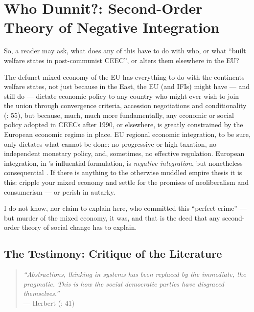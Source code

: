 \documentclass[11pt,a4paper,oneside,openright]{article}
\begin{document}
\newpage

\section{Who Dunnit?: Second-Order Theory of Negative Integration} \label{sec:who_dunnit}

So, a reader may ask, what does any of this have to do with who, or what  ``built welfare states in post-communist \gls{CEEC}'', or alters them elsewhere in the \gls{EU}? 

The defunct mixed economy of the \gls{EU} has everything to do with the continents welfare states, not just because in the East, the \gls{EU} (and \glspl{IFI}) might have --- and still do --- dictate economic policy to any country who might ever wish to join the union through convergence criteria, accession negotiations and conditionality (\citealt{Bonker2006}: 55), but because, much, much more fundamentally, any economic or social policy adopted in \glspl{CEEC} after 1990, or elsewhere, is greatly constrained by the European economic regime in place. 
\gls{EU} regional economic integration, to be sure, only dictates what cannot be done: 
no progressive or high taxation, no independent monetary policy, and, sometimes, no effective regulation. 
European integration, in \citeauthor{Scharpf1997}'s influential formulation, is \emph{negative integration}, but nonetheless consequential \citep{Scharpf1997}. 
If there is anything to the otherwise muddled empire thesis \citep{BeckGrande-2007-aa} it is this: 
cripple your mixed economy and settle for the promises of neoliberalism and consumerism --- or perish in autarky.

I do not know, nor claim to explain here, who committed this ``perfect crime'' \citep{Galbraith2002a} --- but murder of the mixed economy, it was, and that is the deed that any second-order theory of social change has to explain.

\subsection[Literature]{The Testimony: Critique of the Literature} \label{sec:Literature}

\begin{quote}
	\emph{``Abstractions, thinking in systems has been replaced by the immediate, the pragmatic. 
	This is how the social democratic parties have disgraced themselves.''}\\
	--- Herbert \citeauthor{Schui2009} (\citeyear{Schui2009}: 41)
\end{quote}
\end{document}
